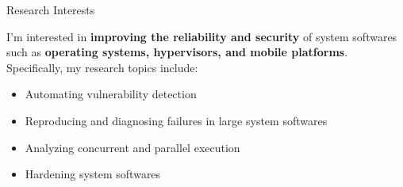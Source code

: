 \begin{rSection}{Research Interests}
\newcommand{\eg}{\textit{e}.\textit{g}.\xspace}

I'm interested in \textbf{improving the reliability and security} of
system softwares such as \textbf{operating systems, hypervisors, and
  mobile platforms}. Specifically, my research topics include:

\begin{itemize}[leftmargin=*,itemsep=-5pt]
\item{Automating vulnerability detection}
\item{Reproducing and diagnosing failures in large system softwares}
\item{Analyzing concurrent and parallel execution}
\item{Hardening system softwares}
\end{itemize}

\end{rSection}
